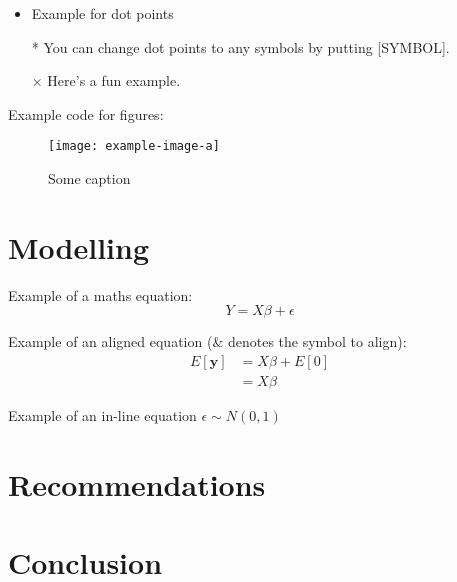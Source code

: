 \documentclass[11pt]{article}
\begin{document}
\begin{itemize} 
    \item Example for dot points
    \item[*] You can change dot points to any symbols by putting [SYMBOL].
    \item[$\times$] Here's a fun example.
\end{itemize} 
\lipsum[4-5]
Example code for figures:
\begin{figure}[h]
    \texttt{[image: example-image-a]}
    \centering
    \caption{Some caption} %
\end{figure}
\lipsum[1-2]

\section{Modelling}
Example of a maths equation:
\begin{equation}
    Y = X\beta + \epsilon
\end{equation}

Example of an aligned equation (\& denotes the symbol to align):
\begin{align*}
    E[\mathbf{y}] &= X\beta + E[0] \\
                  &= X\beta
\end{align*}

Example of an in-line equation $\epsilon \sim N(0, 1)$ \\

\section{Recommendations}
\lipsum[10]

\section{Conclusion}
\lipsum[14-15]


\clearpage

\printbibliography
\end{document}
